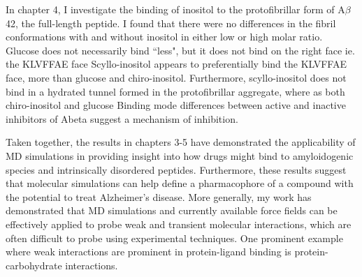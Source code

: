 In chapter 4, I investigate the binding of inositol to the protofibrillar form of A$\beta$42, the full-length peptide. I found that there were no differences in the fibril conformations with and without inositol in either low or high molar ratio.
Glucose does not necessarily bind ``less", but it does not bind on the right face ie. the KLVFFAE face Scyllo-inositol appears to preferentially bind the KLVFFAE face, more than glucose and chiro-inositol.  Furthermore, scyllo-inositol does not bind in a hydrated tunnel formed in the protofibrillar aggregate, where as both chiro-inositol and glucose Binding mode differences between active and inactive inhibitors of Abeta suggest a mechanism of inhibition.

Taken together, the results in chapters 3-5 have demonstrated the applicability of MD simulations in providing insight into how drugs might bind to amyloidogenic species and intrinsically disordered peptides.  Furthermore, these results suggest that molecular simulations can help define a pharmacophore of a compound with the potential to treat Alzheimer's disease. 
More generally, my work has demonstrated that MD simulations and currently available force fields can be effectively applied to probe weak and transient molecular interactions, which are often difficult to probe using experimental techniques. One prominent example where weak interactions are prominent in protein-ligand binding is protein-carbohydrate interactions.\cite{weak binding review paper}

